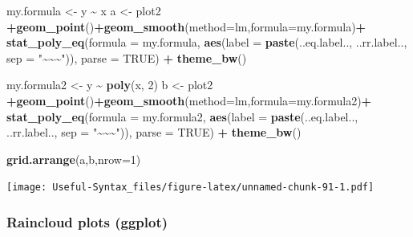 \documentclass[
]{article}
\newenvironment{Shaded}{\begin{snugshade}}{\end{snugshade}}
\newcommand{\AttributeTok}[1]{\textcolor[rgb]{0.13,0.29,0.53}{#1}}
\newcommand{\ConstantTok}[1]{\textcolor[rgb]{0.56,0.35,0.01}{#1}}
\newcommand{\DecValTok}[1]{\textcolor[rgb]{0.00,0.00,0.81}{#1}}
\newcommand{\FunctionTok}[1]{\textcolor[rgb]{0.13,0.29,0.53}{\textbf{#1}}}
\newcommand{\NormalTok}[1]{#1}
\newcommand{\OtherTok}[1]{\textcolor[rgb]{0.56,0.35,0.01}{#1}}
\newcommand{\SpecialCharTok}[1]{\textcolor[rgb]{0.81,0.36,0.00}{\textbf{#1}}}
\newcommand{\StringTok}[1]{\textcolor[rgb]{0.31,0.60,0.02}{#1}}
\begin{document}
\begin{Shaded}
\begin{Highlighting}[]
\NormalTok{my.formula }\OtherTok{\textless{}{-}}\NormalTok{ y }\SpecialCharTok{\textasciitilde{}}\NormalTok{ x}
\NormalTok{a }\OtherTok{\textless{}{-}}\NormalTok{ plot2 }\SpecialCharTok{+}\FunctionTok{geom\_point}\NormalTok{()}\SpecialCharTok{+}\FunctionTok{geom\_smooth}\NormalTok{(}\AttributeTok{method=}\StringTok{\textquotesingle{}lm\textquotesingle{}}\NormalTok{,}\AttributeTok{formula=}\NormalTok{my.formula)}\SpecialCharTok{+}
  \FunctionTok{stat\_poly\_eq}\NormalTok{(}\AttributeTok{formula =}\NormalTok{ my.formula, }\FunctionTok{aes}\NormalTok{(}\AttributeTok{label =} \FunctionTok{paste}\NormalTok{(..eq.label.., ..rr.label..,}
                                                       \AttributeTok{sep =} \StringTok{"\textasciitilde{}\textasciitilde{}\textasciitilde{}"}\NormalTok{)), }\AttributeTok{parse =} \ConstantTok{TRUE}\NormalTok{) }\SpecialCharTok{+}
  \FunctionTok{theme\_bw}\NormalTok{()}

\NormalTok{my.formula2 }\OtherTok{\textless{}{-}}\NormalTok{ y }\SpecialCharTok{\textasciitilde{}} \FunctionTok{poly}\NormalTok{(x, }\DecValTok{2}\NormalTok{)}
\NormalTok{b }\OtherTok{\textless{}{-}}\NormalTok{ plot2 }\SpecialCharTok{+}\FunctionTok{geom\_point}\NormalTok{()}\SpecialCharTok{+}\FunctionTok{geom\_smooth}\NormalTok{(}\AttributeTok{method=}\StringTok{\textquotesingle{}lm\textquotesingle{}}\NormalTok{,}\AttributeTok{formula=}\NormalTok{my.formula2)}\SpecialCharTok{+}
  \FunctionTok{stat\_poly\_eq}\NormalTok{(}\AttributeTok{formula =}\NormalTok{ my.formula2, }\FunctionTok{aes}\NormalTok{(}\AttributeTok{label =} \FunctionTok{paste}\NormalTok{(..eq.label.., ..rr.label..,}
                                                        \AttributeTok{sep =} \StringTok{"\textasciitilde{}\textasciitilde{}\textasciitilde{}"}\NormalTok{)), }\AttributeTok{parse =} \ConstantTok{TRUE}\NormalTok{) }\SpecialCharTok{+}
  \FunctionTok{theme\_bw}\NormalTok{()}

\FunctionTok{grid.arrange}\NormalTok{(a,b,}\AttributeTok{nrow=}\DecValTok{1}\NormalTok{)}
\end{Highlighting}
\end{Shaded}

\texttt{[image: Useful-Syntax\_files/figure-latex/unnamed-chunk-91-1.pdf]}

\hypertarget{raincloud-plots-ggplot}{%
\subsubsection{Raincloud plots (ggplot)}\label{raincloud-plots-ggplot}}
\end{document}
